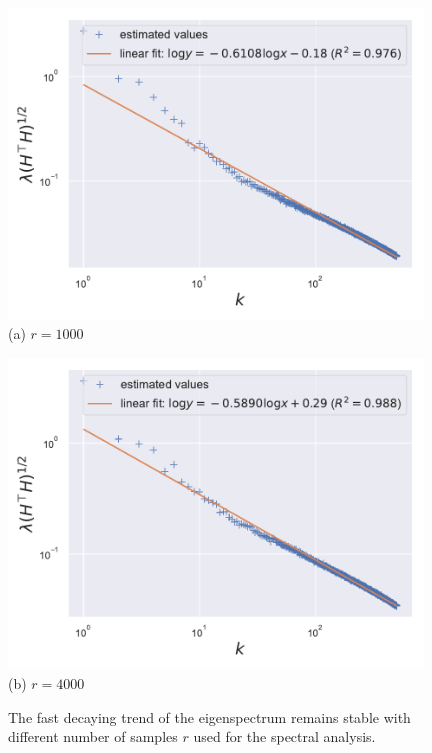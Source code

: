 \begin{figure}[thb]
\begin{center}
\begin{minipage}[t]{0.45\linewidth}
\centering
{\includegraphics[width=0.98\textwidth]{figs/privlm/roberta/less_samples_no_trim_front/eigenvalue-linfit.pdf}}
(a) $r=1000$
\end{minipage}
\begin{minipage}[t]{0.45\linewidth}
\centering
{\includegraphics[width=0.98\textwidth]{figs/privlm/roberta/npi_000010/eigenvalue-linfit.pdf}}
(b) $r=4000$
\end{minipage}
\end{center}
\caption{
The fast decaying trend of the eigenspectrum remains stable with different number of samples $r$ used for the spectral analysis.
}
\label{fig:num_grad_sample_robust}
\end{figure}

